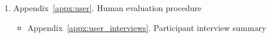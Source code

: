 \begin{enumerate}
\begin{itemize}
    \item Appendix~\ref{appx:threshold_exp}. Threshold protocol
    \item Appendix~\ref{appx:policy_comparison}. Ablation reporting
    \item Appendix~\ref{appx:vlm_failure_analysis}. VLM failure classification
    \item Appendix~\ref{appx:knowno_impl}. KnowNo action requests
  \end{itemize}
  \item Appendix~\ref{appx:user}. Human evaluation procedure
  \begin{itemize}
    \item Appendix~\ref{appx:user_interviews}. Participant interview summary
  \end{itemize}
\end{enumerate}
